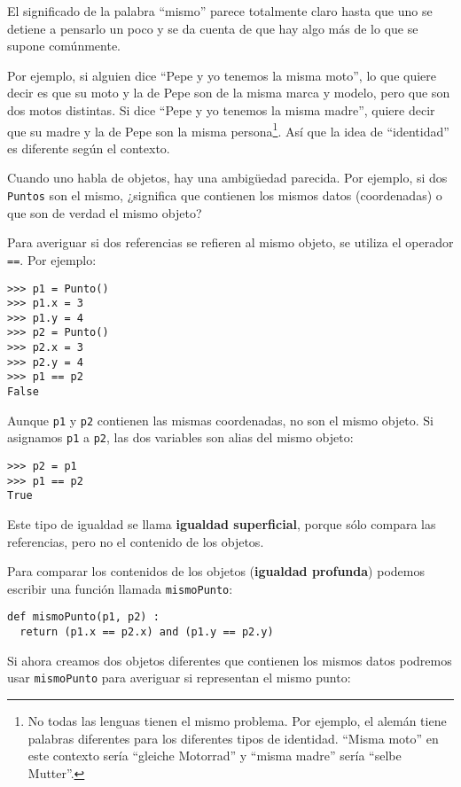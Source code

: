 
El significado de la palabra ``mismo'' parece totalmente claro hasta
que uno se detiene a pensarlo un poco y se da cuenta de que hay algo
más de lo que se supone comúnmente.

  

Por ejemplo, si alguien dice ``Pepe y yo tenemos la misma moto'',
lo que quiere decir es que su moto y la de Pepe son de la misma marca
y modelo, pero que son dos motos distintas. Si dice ``Pepe y yo tenemos
la misma madre'', quiere decir que su madre y la de Pepe son la misma
persona\footnote{No todas las lenguas tienen el mismo problema. Por ejemplo, el alemán
tiene palabras diferentes para los diferentes tipos de identidad.
``Misma moto'' en este contexto sería ``gleiche Motorrad'' y ``misma
madre'' sería ``selbe Mutter''.}. Así que la idea de ``identidad'' es diferente según el contexto.

Cuando uno habla de objetos, hay una ambigüedad parecida. Por ejemplo,
si dos \texttt{Puntos} son el mismo, ¿significa que contienen los
mismos datos (coordenadas) o que son de verdad el mismo objeto?

Para averiguar si dos referencias se refieren al mismo objeto, se
utiliza el operador \texttt{==}. Por ejemplo:
\begin{lstlisting}
>>> p1 = Punto()
>>> p1.x = 3
>>> p1.y = 4
>>> p2 = Punto()
>>> p2.x = 3
>>> p2.y = 4
>>> p1 == p2
False
\end{lstlisting}

Aunque \texttt{p1} y \texttt{p2} contienen las mismas coordenadas,
no son el mismo objeto. Si asignamos \texttt{p1} a \texttt{p2}, las
dos variables son alias del mismo objeto:
\begin{lstlisting}
>>> p2 = p1
>>> p1 == p2
True
\end{lstlisting}

Este tipo de igualdad se llama \textbf{igualdad superficial}, porque
sólo compara las referencias, pero no el contenido de los objetos.

  

Para comparar los contenidos de los objetos (\textbf{igualdad profunda})
podemos escribir una función llamada \texttt{mismoPunto}:

\begin{lstlisting}
def mismoPunto(p1, p2) :
  return (p1.x == p2.x) and (p1.y == p2.y)
\end{lstlisting}
 Si ahora creamos dos objetos diferentes que contienen los mismos
datos podremos usar \texttt{mismoPunto} para averiguar si representan
el mismo punto:

